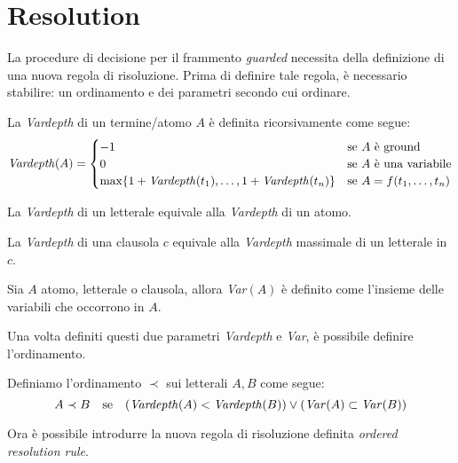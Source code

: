 \section{Resolution}
La procedure di decisione per il frammento \emph{guarded} necessita della definizione di una nuova regola di risoluzione.
Prima di definire tale regola, è necessario stabilire: un ordinamento e dei parametri secondo cui ordinare.
\begin{definition}
    La \emph{Vardepth} di un termine/atomo $A$ è definita ricorsivamente come segue:
    \[\text{\emph{Vardepth}}(A) = 
    \begin{cases}
        -1 & \text{se $A$ è ground}\\
        0 & \text{se $A$ è una variabile}\\
        \max\{1+\text{\emph{Vardepth}}(t_1), \dots, 1+\text{\emph{Vardepth}}(t_n)\} & \text{se }A=f(t_1,\dots,t_n)
    \end{cases}\]
\end{definition}
\begin{definition}
    La \emph{Vardepth} di un letterale equivale alla \emph{Vardepth} di un atomo.
\end{definition}
\begin{definition}
    La \emph{Vardepth} di una clausola $c$ equivale alla \emph{Vardepth} massimale di un letterale in $c$. 
\end{definition}
\begin{definition}
    Sia $A$ atomo, letterale o clausola, allora \emph{Var}$(A)$ è definito come l'insieme delle 
    variabili che occorrono in $A$.
\end{definition}
Una volta definiti questi due parametri \emph{Vardepth} e \emph{Var}, è possibile definire l'ordinamento.
\begin{definition}
    Definiamo l'ordinamento $\prec$ sui letterali $A,B$ come segue:
    \[A\prec B \quad\text{se}\quad(\text{\emph{Vardepth}}(A)<\text{\emph{Vardepth}}(B)) \lor (\text{\emph{Var}}(A)\subset\text{\emph{Var}}(B))\]
\end{definition}
Ora è possibile introdurre la nuova regola di risoluzione definita \emph{ordered resolution rule}.
